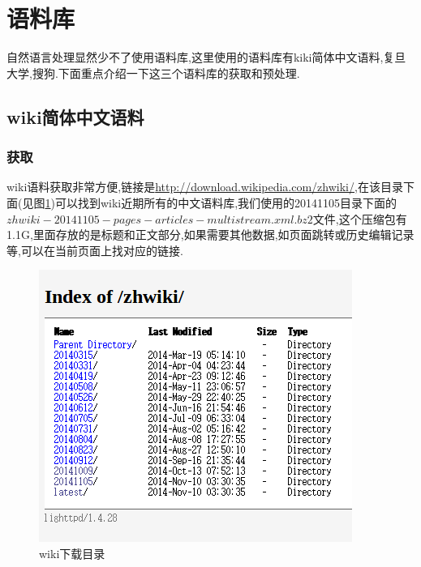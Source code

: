 \section{语料库}
自然语言处理显然少不了使用语料库,这里使用的语料库有kiki简体中文语料,复旦大学,搜狗.下面重点介绍一下这三个语料库的获取和预处理.
\subsection{wiki简体中文语料}
\subsubsection{获取}
wiki语料获取非常方便,链接是\url{http://download.wikipedia.com/zhwiki/},在该目录下面(见图\ref{fig:corpus:wiki})可以找到wiki近期所有的中文语料库,我们使用的20141105目录下面的$zhwiki-20141105-pages-articles-multistream.xml.bz2$文件,这个压缩包有1.1G,里面存放的是标题和正文部分,如果需要其他数据,如页面跳转或历史编辑记录等,可以在当前页面上找对应的链接.
\begin{figure}[!htbp]
	\centering
	\includegraphics[scale=0.5]{figs/corpus_wiki.png} 
	\caption{wiki下载目录}    
	\label{fig:corpus:wiki}
\end{figure}

